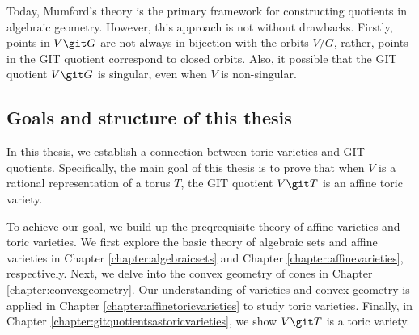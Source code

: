\documentclass[12pt]{amsart}
\theoremstyle{plain}
\theoremstyle{definition}
\begin{document}
Today, Mumford's theory is the primary framework for constructing quotients in algebraic geometry.
However, this approach is not without drawbacks.
Firstly, points in $V \git G$ are not always in bijection with the orbits $V / G$, rather, points in the GIT quotient correspond to closed orbits.
Also, it possible that the GIT quotient $V \git G$ is singular, even when $V$ is non-singular.


\newpage
\subsection*{Goals and structure of this thesis}
In this thesis, we establish a connection between toric varieties and GIT quotients.
Specifically, the main goal of this thesis is to prove that when $V$ is a rational representation of a torus $T$, the GIT quotient $V \git T$ is an affine toric variety.

To achieve our goal, we build up the preqrequisite theory of affine varieties and toric varieties.
We first explore the basic theory of algebraic sets and affine varieties in Chapter \ref{chapter:algebraicsets} and Chapter \ref{chapter:affinevarieties}, respectively.
Next, we delve into the convex geometry of cones in Chapter \ref{chapter:convexgeometry}.
Our understanding of varieties and convex geometry is applied in Chapter \ref{chapter:affinetoricvarieties} to study toric varieties.
Finally, in Chapter \ref{chapter:gitquotientsastoricvarieties}, we show $V \git T$ is a toric variety.
\end{document}
